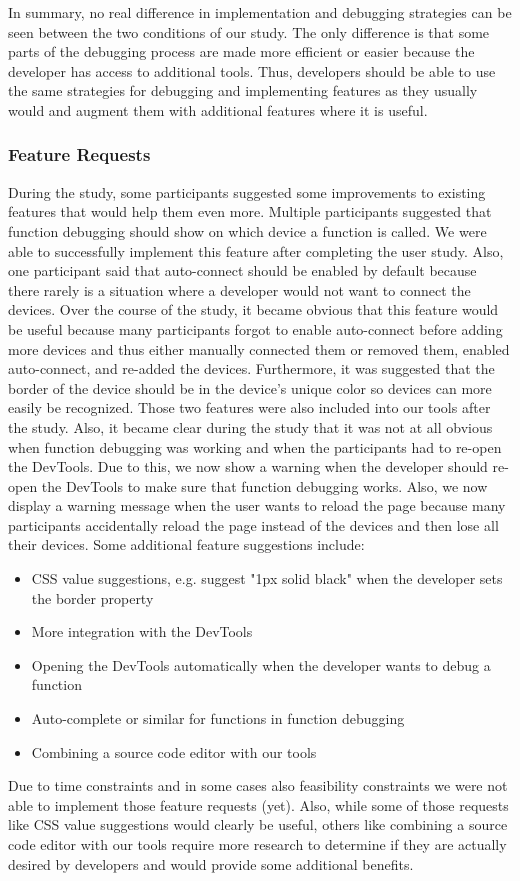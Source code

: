 In summary, no real difference in implementation and debugging strategies can be seen between the two conditions of our study. The only difference is that some parts of the debugging process are made more efficient or easier because the developer has access to additional tools. Thus, developers should be able to use the same strategies for debugging and implementing features as they usually would and augment them with additional features where it is useful. 

\subsubsection{Feature Requests}

During the study, some participants suggested some improvements to existing features that would help them even more. Multiple participants suggested that function debugging should show on which device a function is called. We were able to successfully implement this feature after completing the user study. Also, one participant said that auto-connect should be enabled by default because there rarely is a situation where a developer would not want to connect the devices. Over the course of the study, it became obvious that this feature would be useful because many participants forgot to enable auto-connect before adding more devices and thus either manually connected them or removed them, enabled auto-connect, and re-added the devices. Furthermore, it was suggested that the border of the device should be in the device's unique color so devices can more easily be recognized. Those two features were also included into our tools after the study. Also, it became clear during the study that it was not at all obvious when function debugging was working and when the participants had to re-open the DevTools. Due to this, we now show a warning when the developer should re-open the DevTools to make sure that function debugging works. Also, we now display a warning message when the user wants to reload the page because many participants accidentally reload the page instead of the devices and then lose all their devices. Some additional feature suggestions include:
\begin{itemize}
	\item CSS value suggestions, e.g. suggest "1px solid black" when the developer sets the border property
	\item More integration with the DevTools
	\item Opening the DevTools automatically when the developer wants to debug a function
	\item Auto-complete or similar for functions in function debugging
	\item Combining a source code editor with our tools
\end{itemize}
Due to time constraints and in some cases also feasibility constraints we were not able to implement those feature requests (yet). Also, while some of those requests like CSS value suggestions would clearly be useful, others like combining a source code editor with our tools require more research to determine if they are actually desired by developers and would provide some additional benefits.